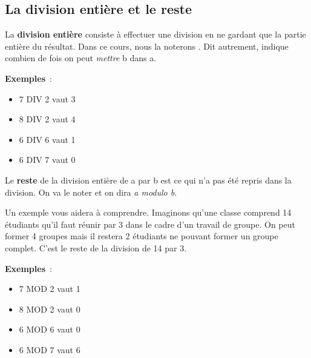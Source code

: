 		\subsection{La division entière et le reste}
		
			La \textbf{division entière} consiste à effectuer une division
			en ne gardant que la partie entière du résultat.
			Dans ce cours, nous la noterons .
			Dit autrement, 
			indique combien de fois on peut \emph{mettre} b dans a.
			
			\begin{minipage}{2cm}
			\textbf{Exemples}~:	
			\\
			\end{minipage}
			\begin{minipage}{9cm}
			\begin{multicols}{2}
			\begin{itemize}
				\item 7 DIV 2 vaut 3
				\item 8 DIV 2 vaut 4
				\item 6 DIV 6 vaut 1
				\item 6 DIV 7 vaut 0
			\end{itemize}
			\end{multicols}
			\end{minipage}
			
			Le \textbf{reste} de la division entière de a par b
			est ce qui n’a pas été repris dans la division.
			On va le noter 
			et on dira \emph{a modulo b}.
	
			Un exemple vous aidera à comprendre.	
			Imaginons qu’une classe comprend 14 étudiants
			qu’il faut réunir par 3
			dans le cadre d’un travail de groupe.
			On peut former 4 groupes 
			mais il restera 2 étudiants ne pouvant former un groupe complet.
			C’est le reste de la division de 14 par 3.
			
			\begin{minipage}{2cm}
			\textbf{Exemples}~:	
			\\
			\end{minipage}
			\begin{minipage}{9cm}
			\begin{multicols}{2}
			\begin{itemize}
				\item 7 MOD 2 vaut 1
				\item 8 MOD 2 vaut 0
				\item 6 MOD 6 vaut 0
				\item 6 MOD 7 vaut 6
			\end{itemize}
			\end{multicols}
			\end{minipage}

